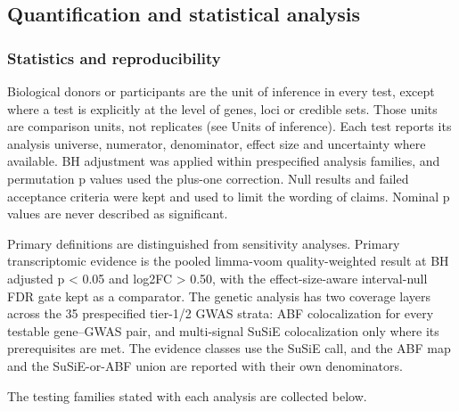 \subsection{Quantification and statistical analysis}\label{quantification-and-statistical-analysis}

\subsubsection{Statistics and reproducibility}\label{statistics-and-reproducibility}

Biological donors or participants are the unit of inference in every test, except where a test is explicitly at the level of genes, loci or credible sets. Those units are comparison units, not replicates (see Units of inference). Each test reports its analysis universe, numerator, denominator, effect size and uncertainty where available. BH adjustment was applied within prespecified analysis families, and permutation p values used the plus-one correction. Null results and failed acceptance criteria were kept and used to limit the wording of claims. Nominal p values are never described as significant.

Primary definitions are distinguished from sensitivity analyses. Primary transcriptomic evidence is the pooled limma-voom quality-weighted result at BH adjusted p \textless{} 0.05 and \textbar log2FC\textbar{} \textgreater{} 0.50, with the effect-size-aware interval-null FDR gate kept as a comparator. The genetic analysis has two coverage layers across the 35 prespecified tier-1/2 GWAS strata: ABF colocalization for every testable gene--GWAS pair, and multi-signal SuSiE colocalization only where its prerequisites are met. The evidence classes use the SuSiE call, and the ABF map and the SuSiE-or-ABF union are reported with their own denominators.

The testing families stated with each analysis are collected below.

